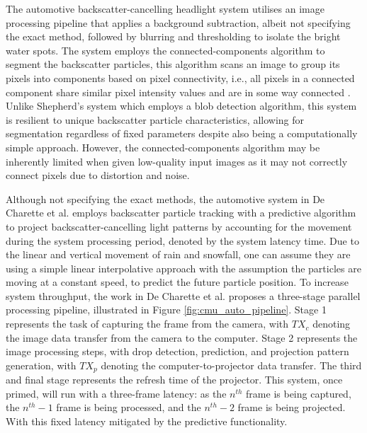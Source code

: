 The automotive backscatter-cancelling headlight system utilises an image processing pipeline that applies a background subtraction, albeit not specifying the exact method, followed by blurring and thresholding to isolate the bright water spots. The system employs the connected-components algorithm to segment the backscatter particles, this algorithm scans an image to group its pixels into components based on pixel connectivity, i.e., all pixels in a connected component share similar pixel intensity values and are in some way connected \cite{robertfisherConnectedComponentsLabeling2003}. Unlike Shepherd's system which employs a blob detection algorithm, this system is resilient to unique backscatter particle characteristics, allowing for segmentation regardless of fixed parameters despite also being a computationally simple approach. However, the connected-components algorithm may be inherently limited when given low-quality input images as it may not correctly connect pixels due to distortion and noise.

Although not specifying the exact methods, the automotive system in De Charette et al. employs backscatter particle tracking with a predictive algorithm to project backscatter-cancelling light patterns by accounting for the movement during the system processing period, denoted by the system latency time. Due to the linear and vertical movement of rain and snowfall, one can assume they are using a simple linear interpolative approach with the assumption the particles are moving at a constant speed, to predict the future particle position. To increase system throughput, the work in De Charette et al. proposes a three-stage parallel processing pipeline, illustrated in Figure \ref{fig:cmu_auto_pipeline}. Stage 1 represents the task of capturing the frame from the camera, with $TX_c$ denoting the image data transfer from the camera to the computer. Stage 2 represents the image processing steps, with drop detection, prediction, and projection pattern generation, with $TX_p$ denoting the computer-to-projector data transfer. The third and final stage represents the refresh time of the projector. This system, once primed, will run with a three-frame latency: as the $n^{th}$ frame is being captured, the $n^{th} - 1$ frame is being processed, and the $n^{th} - 2$ frame is being projected. With this fixed latency mitigated by the predictive functionality.

